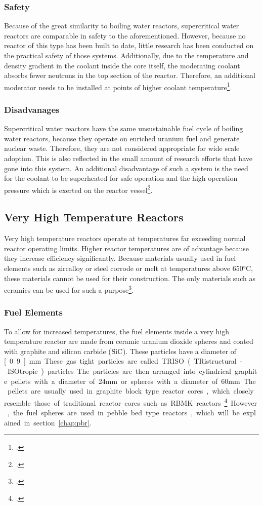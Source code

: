 \subsubsection{Safety}
Because of the great similarity to boiling water reactors, supercritical water reactors are comparable
in safety to the aforementioned. However, because no reactor of this type has been built to date,
little research has been conducted on the practical safety of those systems.
Additionally, due to the temperature and density gradient in the coolant inside the core itself,
the moderating coolant absorbs fewer neutrons in the top section of the reactor. Therefore,
an additional moderator needs to be installed at points of higher coolant temperature\footcite[52-53]{T4Gen}.
\subsubsection{Disadvanages}
Supercritical water reactors have the same unsustainable fuel cycle of boiling water reactors,
because they operate on enriched uranium fuel and generate nuclear waste. Therefore, they are
not considered appropriate for wide scale adoption. This is also reflected in the small amount
of research efforts that have gone into this system.
An additional disadvantage of such a system is the need for the coolant to be superheated for
safe operation and the high operation pressure which is exerted on the reactor vessel\footcite[52-53]{T4Gen}.
\pagebreak
\subsection{Very High Temperature Reactors}
Very high temperature reactors operate at temperatures far exceeding normal reactor operating limits.
Higher reactor temperatures are of advantage because they increase efficiency significantly.
Because materials usually used in fuel elements such as zircalloy or steel corrode or melt at temperatures
above 650°C, these materials cannot be used for their construction.
The only materials such as ceramics can be used for such a purpose\footcite[55]{T4Gen}.
\subsubsection{Fuel Elements}
To allow for increased temperatures, the fuel elements inside a very high temperature reactor are made
from ceramic uranium dioxide spheres and coated with graphite and silicon carbide ($\ce{SiC}$). These
particles have a diameter of \unit[0.9]{mm}. These gas tight particles are called TRISO (TRistructural-ISOtropic) particles.
The particles are then arranged into cylindrical graphite
pellets with a diameter of 24mm or spheres with a diameter of 60mm. The pellets are usually used in
graphite block type reactor cores, which closely resemble those of traditional reactor cores such
as RBMK reactors\footcite[56]{T4Gen}. However, the fuel spheres are used in pebble bed type reactors, which will be explained
in section~\ref{chap:pbr}.

